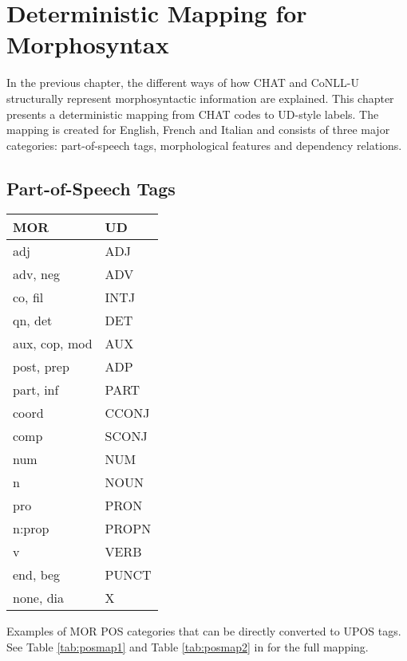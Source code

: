 \chapter{Deterministic Mapping for Morphosyntax} %
\label{Chapter7} %

In the previous chapter, the different ways of how CHAT and CoNLL-U structurally represent morphosyntactic information are explained. This chapter presents a deterministic mapping from CHAT codes to UD-style labels. The mapping is created for English, French and Italian and consists of three major categories: part-of-speech tags, morphological features and dependency relations.


\section{Part-of-Speech Tags}
\label{sec:pos}
\begin{margintable}[1\baselineskip] %
\begin{tabularx}{\textwidth}{@{}Ll@{}}
\toprule
\textbf{MOR} & \textbf{UD}\\ \midrule
adj & ADJ\\
adv, neg & ADV\\
co, fil & INTJ\\
qn, det & DET\\
aux, cop, mod & AUX\\
post, prep & ADP\\
part, inf & PART\\
coord & CCONJ\\
comp & SCONJ\\
num & NUM\\
n & NOUN\\
pro & PRON\\
n:prop & PROPN\\
v & VERB\\
end, beg & PUNCT\\
none, dia & X\\\bottomrule
\end{tabularx}
\caption{\label{tab:martabpos}Examples of MOR POS categories that can be directly converted to UPOS tags. See Table \ref{tab:posmap1} and Table \ref{tab:posmap2} in  for the full mapping.}
\footnotesize
\end{margintable}


